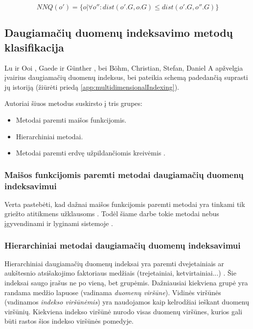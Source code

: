 \begin{equation}
	NNQ(o') = \{ o | \forall o'' : dist(o'.G, o.G) \leq dist(o'.G, o''.G) \}
\label{eq:ExactMatchQuery}
\end{equation}




\subsection{Daugiamačių duomenų indeksavimo metodų klasifikacija}
Lu ir Ooi \cite{lu1993spatial}, Gaede ir Günther \cite{gaede1998multidimensional}, bei B{\"o}hm, Christian, Stefan, Daniel A \cite{bohm2001searching} apžvelgia įvairius daugiamačių duomenų indeksus, bei pateikia schemą padedančią suprasti jų istoriją (žiūrėti priedą \ref{app:multidimensionalIndexing}).

Autoriai šiuos metodus suskirsto į tris grupes:
\begin{itemize}
	\item Metodai paremti maišos funkcijomis.
	\item Hierarchiniai metodai.
	\item Metodai paremti erdvę užpildančiomis kreivėmis \cite{bader2012space}.
\end{itemize}



\subsubsection{Maišos funkcijomis paremti metodai daugiamačių duomenų indeksavimui}


Verta pastebėti, kad dažnai maišos funkcijomis paremti metodai yra tinkami tik griežto atitikmens užklausoms \cite{nievergelt1981grid} \cite{tamminen1982excell}.
Todėl šiame darbe tokie metodai nebus įgyvendinami ir lyginami sistemoje \cite{NeurotechnologyMegamatcherAccelerator}.


\subsubsection{Hierarchiniai metodai daugiamačių duomenų indeksavimui}

Hierarchiniai daugiamačių duomenų indeksai yra paremti dvejetainiais ar aukštesnio atsišakojimo faktoriaus medžiais (trejetainiai, ketvirtainiai...) \cite{gaede1998multidimensional}.
Šie indeksai saugo įrašus ne po vieną, bet grupėmis.
Dažniausiai kiekviena grupė yra randama medžio lapuose (vadinama {\it duomenų viršūne}).
Vidinės viršūnės (vadinamos {\it indekso viršūnėmis}) yra naudojamos kaip kelrodžiai ieškant duomenų viršūnių.
Kiekviena indekso viršūnė nurodo visas duomenų viršūnes, kurios gali būti rastos šios indekso viršūnės pomedyje.

